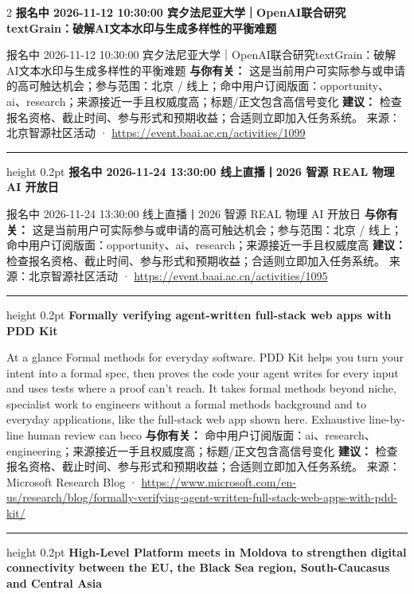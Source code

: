 \documentclass[10.5pt]{ctexart}
\begin{document}
\begin{multicols}{2}
{\large\bfseries 报名中 2026-11-12 10:30:00 宾夕法尼亚大学｜OpenAI联合研究textGrain：破解AI文本水印与生成多样性的平衡难题}\par
报名中 2026-11-12 10:30:00 宾夕法尼亚大学｜OpenAI联合研究textGrain：破解AI文本水印与生成多样性的平衡难题
\textbf{与你有关：} 这是当前用户可实际参与或申请的高可触达机会；参与范围：北京 / 线上；命中用户订阅版面：opportunity、ai、research；来源接近一手且权威度高；标题/正文包含高信号变化
\textbf{建议：} 检查报名资格、截止时间、参与形式和预期收益；合适则立即加入任务系统。
{\footnotesize\color{ormuted} 来源：北京智源社区活动 · \url{https://event.baai.ac.cn/activities/1099}}
\vspace{2mm}
\hrule height 0.2pt
\vspace{2mm}
{\large\bfseries 报名中 2026-11-24 13:30:00 线上直播丨2026 智源 REAL 物理 AI 开放日}\par
报名中 2026-11-24 13:30:00 线上直播丨2026 智源 REAL 物理 AI 开放日
\textbf{与你有关：} 这是当前用户可实际参与或申请的高可触达机会；参与范围：北京 / 线上；命中用户订阅版面：opportunity、ai、research；来源接近一手且权威度高
\textbf{建议：} 检查报名资格、截止时间、参与形式和预期收益；合适则立即加入任务系统。
{\footnotesize\color{ormuted} 来源：北京智源社区活动 · \url{https://event.baai.ac.cn/activities/1095}}
\vspace{2mm}
\hrule height 0.2pt
\vspace{2mm}
{\large\bfseries Formally verifying agent-written full-stack web apps with PDD Kit}\par
At a glance Formal methods for everyday software. PDD Kit helps you turn your intent into a formal spec, then proves the code your agent writes for every input and uses tests where a proof can’t reach. It takes formal methods beyond niche, specialist work to engineers without a formal methods background and to everyday applications, like the full-stack web app shown here. Exhaustive line-by-line human review can beco
\textbf{与你有关：} 命中用户订阅版面：ai、research、engineering；来源接近一手且权威度高；标题/正文包含高信号变化
\textbf{建议：} 检查报名资格、截止时间、参与形式和预期收益；合适则立即加入任务系统。
{\footnotesize\color{ormuted} 来源：Microsoft Research Blog · \url{https://www.microsoft.com/en-us/research/blog/formally-verifying-agent-written-full-stack-web-apps-with-pdd-kit/}}
\vspace{2mm}
\hrule height 0.2pt
\vspace{2mm}
{\large\bfseries High-Level Platform meets in Moldova to strengthen digital connectivity between the EU, the Black Sea region, South-Caucasus and Central Asia}\par

\end{multicols}
\end{document}
